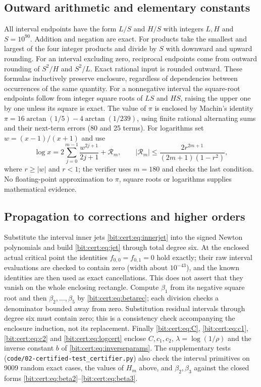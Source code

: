 \documentclass[11pt]{article}
\theoremstyle{definition}\newtheorem{definition}[theorem]{Definition}
\theoremstyle{remark}\newtheorem{remark}[theorem]{Remark}
\begin{document}
\subsection{Outward arithmetic and elementary constants}
All interval endpoints have the form $L/S$ and $H/S$ with integers $L,H$ and
$S=10^{90}$. Addition and negation are exact. For products take the smallest
and largest of the four integer products and divide by $S$ with downward and
upward rounding. For an interval excluding zero, reciprocal endpoints come from
outward rounding of $S^2/H$ and $S^2/L$. Exact rational input is rounded
outward. These formulas inductively preserve enclosure, regardless of
dependencies between occurrences of the same quantity. For a nonnegative
interval the square-root endpoints follow from integer square roots of $LS$ and
$HS$, raising the upper one by one unless its square is exact. The value of
$\pi$ is enclosed by Machin's identity
$\pi=16\arctan(1/5)-4\arctan(1/239)$, using finite rational alternating sums
and their next-term errors (80 and 25 terms). For logarithms set
$w=(x-1)/(x+1)$ and use
\begin{equation}\label{bit:cert:eq:logcert}
 \log x=2\sum_{j=0}^{m-1}\frac{w^{2j+1}}{2j+1}+\mathcal R_m,
 \qquad |\mathcal R_m|\le\frac{2r^{2m+1}}{(2m+1)(1-r^2)},
\end{equation}
where $r\ge|w|$ and $r<1$; the verifier uses $m=180$ and checks the last
condition. No floating-point approximation to $\pi$, square roots or logarithms
supplies mathematical evidence.

\subsection{Propagation to corrections and higher orders}
Substitute the interval inner jets \eqref{bit:cert:eq:innerjet} into the
signed Newton polynomials and build \eqref{bit:cert:eq:jet} through total
degree six. At the enclosed actual critical point the identities
$f_{0,0}=f_{0,1}=0$ hold exactly; their raw interval evaluations are checked to
contain zero (width about $10^{-43}$), and the known identities are then used
as exact cancellations. This does not assert that they vanish on the whole
enclosing rectangle. Compute $\beta_1$ from its negative square root and then
$\beta_2,\ldots,\beta_5$ by \eqref{bit:cert:eq:betarec}; each division checks
a denominator bounded away from zero. Substitution residual intervals through
degree six must contain zero; this is a consistency check accompanying the
enclosure induction, not its replacement. Finally \eqref{bit:cert:eq:C},
\eqref{bit:cert:eq:c1}, \eqref{bit:cert:eq:c2} and \eqref{bit:cert:eq:logcert}
enclose $C,c_1,c_2$, $\lambda=\log(1/\rho)$ and the inverse constant $b$ of
\eqref{bit:cert:eq:inverseparams}. The supplementary tests
(\texttt{code/02-certified-test\_certifier.py}) also check the interval
primitives on 9009 random exact cases, the values of $H_m$ above, and
$\beta_2,\beta_3$ against the closed forms
\eqref{bit:cert:eq:beta2}--\eqref{bit:cert:eq:beta3}.
\end{document}
